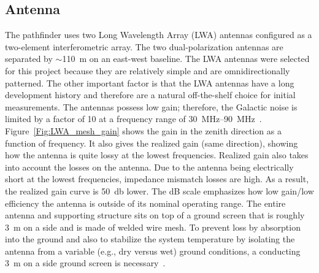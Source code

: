 \subsection{Antenna}\label{s:antenna}

The pathfinder uses two Long Wavelength Array (LWA) antennas configured as a two-element interferometric array. The two dual-polarization antennas are separated by $\sim$\SI{110}{\meter} on an east-west baseline. The LWA antennas were selected for this project because they are relatively simple and are omnidirectionally patterned. The other important factor is that the LWA antennas have a long development history and therefore are a natural off-the-shelf choice for initial measurements. The antennas possess low gain; therefore, the Galactic noise is limited by a factor of 10 at a frequency range of \SIrange{30}{90}{\mega \hertz}~\citep{Memo28, Memo27}. Figure~\ref{Fig:LWA_mesh_gain} shows the gain in the zenith direction as a function of frequency. It also gives the realized gain (same direction), showing how the antenna is quite lossy at the lowest frequencies. Realized gain also takes into account the losses on the antenna. Due to the antenna being electrically short at the lowest frequencies, impedance mismatch losses are high. As a result, the realized gain curve is \SI{50}{\decibel} lower. The dB scale emphasizes how low gain/low efficiency the antenna is outside of its nominal operating range. The entire antenna and supporting structure sits on top of a ground screen that is roughly \SI{3}{\meter} on a side and is made of welded wire mesh. To prevent loss by absorption into the ground and also to stabilize the system temperature by isolating the antenna from a variable (e.g., dry versus wet) ground conditions, a conducting \SI{3}{\meter} on a side ground screen is necessary~\citep{Memo157}.

